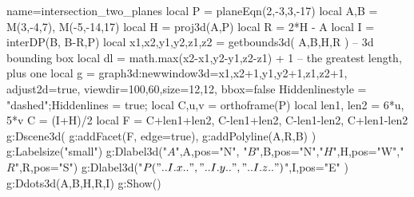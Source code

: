 \documentclass[12pt]{standalone}%
\begin{document}
\begin{luadraw}{name=intersection_two_planes}
local P = planeEqn(2,-3,3,-17)
local A,B = M(3,-4,7), M(-5,-14,17)
local H = proj3d(A,P)
local R = 2*H - A
local I = interDP({B, B-R},P)
local x1,x2,y1,y2,z1,z2 = getbounds3d( {A,B,H,R} ) -- 3d bounding box
local dl = math.max(x2-x1,y2-y1,z2-z1) + 1 -- the greatest length, plus one
local g = graph3d:new{window3d={x1,x2+1,y1,y2+1,z1,z2+1}, adjust2d=true, viewdir={100,60},size={12,12}, bbox=false}
Hiddenlinestyle = "dashed";Hiddenlines = true;
local C,u,v = orthoframe(P)
local len1, len2 = 6*u, 5*v
C = (I+H)/2
local F = {C+len1+len2, C-len1+len2, C-len1-len2, C+len1-len2}
g:Dscene3d(
    g:addFacet(F, {edge=true}),
    g:addPolyline({{A,R,B}})
)
g:Labelsize("small")
g:Dlabel3d("$A$",A,{pos="N"}, "$B$",B,{pos="N"},"$H$",H,{pos="W"},"$R$",R,{pos="S"})
g:Dlabel3d("$P("..I.x..","..I.y..","..I.z..")$",I,{pos="E"} )
g:Ddots3d({A,B,H,R,I})
g:Show()
\end{luadraw} 
\end{document}
